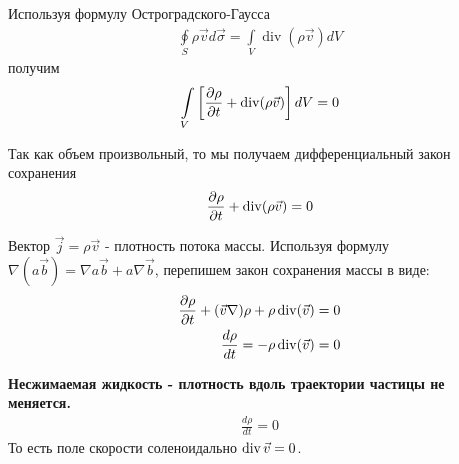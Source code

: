 Используя формулу Остроградского-Гаусса
\begin{align*} 
\oint\limits_{S} \rho \vec{v} d \vec{\sigma}=\int\limits_{V} \operatorname{div}(\rho \vec{v}) d V
\end{align*}
получим 
\begin{align*} 
\int\limits_{V}\left[\frac{\partial \rho}{\partial t}+\operatorname{div}(\rho \vec{v})\right] d V=0
\end{align*}

Так как объем произвольный, то мы получаем дифференциальный закон сохранения
\begin{align*} 
\frac{\partial \rho}{\partial t}+\operatorname{div}(\rho \vec{v})=0
\end{align*}

Вектор $ \vec{j}=\rho \vec{v} $ - плотность потока массы. Используя формулу $ \nabla(a \vec{b})=\nabla a \vec{b}+a \nabla \vec{b} $, перепишем закон сохранения массы в виде:
\begin{align*} 
\frac{\partial \rho}{\partial t}+(\vec{v} \nabla) \rho+\rho \operatorname{div}(\vec{v})=0 \\
\frac{d \rho}{d t}=-\rho \operatorname{div}(\vec{v})=0
\end{align*}

\textbf{Несжимаемая жидкость - плотность вдоль траектории частицы не меняется.}
\begin{align*} 
\frac{d \rho}{d t}=0
\end{align*}
То есть поле скорости соленоидально $\operatorname{div}\vec{v}=0$.